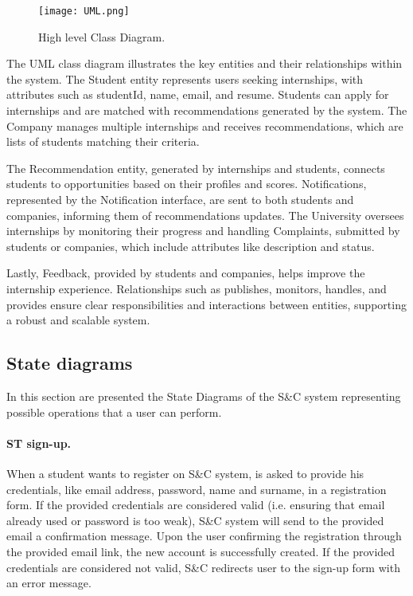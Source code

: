 \begin{figure}[H]
    \begin{center}
        \texttt{[image: UML.png]}
        \caption{High level Class Diagram.}
        \label{fig:UML}%
    \end{center}
\end{figure}

The UML class diagram illustrates the key entities and their relationships within the system. The Student entity represents users seeking internships, with attributes such as studentId, name, email, and resume. Students can apply for internships and are matched with recommendations generated by the system. The Company manages multiple internships and receives recommendations, which are lists of students matching their criteria.

The Recommendation entity, generated by internships and students, connects students to opportunities based on their profiles and scores. Notifications, represented by the Notification interface, are sent to both students and companies, informing them of recommendations updates. The University oversees internships by monitoring their progress and handling Complaints, submitted by students or companies, which include attributes like description and status.

Lastly, Feedback, provided by students and companies, helps improve the internship experience. Relationships such as publishes, monitors, handles, and provides ensure clear responsibilities and interactions between entities, supporting a robust and scalable system.\\


\subsection{State diagrams}
\label{subsec:state_diagrams}%
In this section are presented the State Diagrams of the S\&C system representing possible operations that a user can perform.

\paragraph{ST sign-up.}
When a student wants to register on S\&C system, is asked to provide his credentials, like email address, password, name and surname,  in a registration form.
If the provided credentials are considered valid (i.e. ensuring that email already used or password is too weak), S\&C system will send to the provided email a confirmation message. Upon the user confirming the registration through the provided email link, the new account is successfully created.
If the provided credentials are considered not valid, S\&C redirects user to the sign-up form with an error message.

